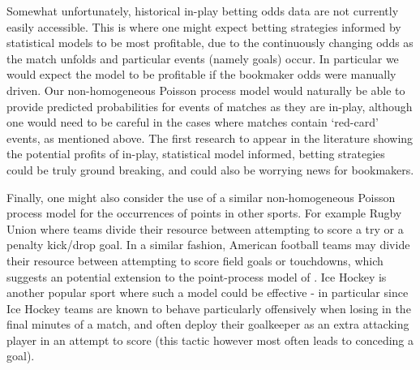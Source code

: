 Somewhat unfortunately, historical in-play betting odds data are not currently easily accessible. This is where one
might expect betting strategies informed by statistical models to be most profitable, due to the continuously changing
odds as the match unfolds and particular events (namely goals) occur. In particular we would expect the model to be
profitable if the bookmaker odds were manually driven. Our non-homogeneous Poisson process model would naturally be able
to provide predicted probabilities for events of matches as they are in-play, although one would need to be careful in
the cases where matches contain `red-card' events, as mentioned above. The first research to appear in the literature
showing the potential profits of in-play, statistical model informed, betting strategies could be truly ground breaking,
and could also be worrying news for bookmakers.

Finally, one might also consider the use of a similar non-homogeneous Poisson process model for the occurrences of
points in other sports. For example Rugby Union where teams divide their resource between attempting to score a try or a
penalty kick/drop goal. In a similar fashion, American football teams may divide their resource between attempting to
score field goals or touchdowns, which suggests an potential extension to the point-process model of \cite{baker2013}.
Ice Hockey is another popular sport where such a model could be effective - in particular since Ice Hockey teams are
known to behave particularly offensively when losing in the final minutes of a match, and often deploy their goalkeeper
as an extra attacking player in an attempt to score (this tactic however most often leads to conceding a goal).



